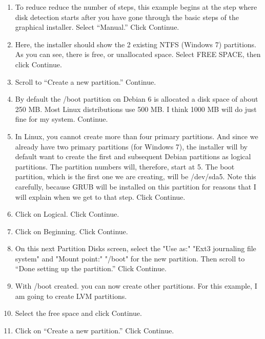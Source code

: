 \documentclass[12pt,notitlepage,onecolumn,oneside,openany,draft]{memoir}
\begin{document}
\begin{enumerate}
\item \textsf{To reduce reduce the number of steps, this example begins at the step where disk detection starts after you have gone through the basic steps of the graphical installer. 
Select “Manual.”  Click Continue.}

\item \textsf{Here, the installer should show the 2 existing NTFS (Windows 7) partitions. As you can see, there is free, or unallocated space. Select FREE SPACE, then click Continue.}

\item \textsf{Scroll to “Create a new partition.” Continue.} 

\item \textsf{By default the /boot partition on Debian 6 is allocated a disk space of about 250 MB. Most Linux distributions use 500 MB. I think 1000 MB will do just fine for my system. Continue.}

\item \textsf{In Linux, you cannot create more than four primary partitions. And since we already have two primary partitions (for Windows 7), the installer will by default want to create the first and subsequent Debian partitions as logical partitions. The partition numbers will, therefore, start at 5. The boot partition, which is the first one we are creating, will be /dev/sda5. Note this carefully, because GRUB will be installed on this partition for reasons that I will explain when we get to that step. Click Continue.}

\item \textsf{Click on Logical. Click Continue.}

\item \textsf{Click on Beginning. Click Continue.} 

\item \textsf{On this next Partition Disks screen, select the "Use as:" "Ext3 journaling file system" and "Mount point:" "/boot" for the new partition. Then scroll to “Done setting up the partition.” Click Continue.}

\item \textsf{With /boot created. you can now create other partitions. For this example, I am going to create LVM partitions.}
 
\item \textsf{Select the free space and click Continue.}
 
\item \textsf{Click on “Create a new partition.” Click Continue.} 


\end{enumerate}
\end{document}
